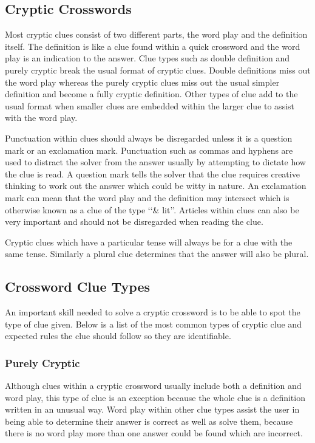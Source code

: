 \subsection{Cryptic Crosswords}
Most cryptic clues consist of two different parts, the word play and the definition itself. The definition is like a clue found within a quick crossword and the word play is an indication to the answer. Clue types such as double definition and purely cryptic break the usual format of cryptic clues. Double definitions miss out the word play whereas the purely cryptic clues miss out the usual simpler definition and become a fully cryptic definition. Other types of clue add to the usual format when smaller clues are embedded within the larger clue to assist with the word play.

Punctuation within clues should always be disregarded unless it is a question mark or an exclamation mark. Punctuation such as commas and hyphens are used to distract the solver from the answer usually by attempting to dictate how the clue is read. A question mark tells the solver that the clue requires creative thinking to work out the answer which could be witty in nature. An exclamation mark can mean that the word play and the definition may intersect which is otherwise known as a clue of the type \lq\lq \& lit\rq\rq. Articles within clues can also be very important and should not be disregarded when reading the clue.

Cryptic clues which have a particular tense will always be for a clue with the same tense. Similarly a plural clue determines that the answer will also be plural.

\subsection{Crossword Clue Types}
An important skill needed to solve a cryptic crossword is to be able to spot the type of clue given. Below is a list of the most common types of cryptic clue and expected rules the clue should follow so they are identifiable. 

\subsubsection{Purely Cryptic}
Although clues within a cryptic crossword usually include both a definition and word play, this type of clue is an exception because the whole clue is a definition written in an unusual way. Word play within other clue types assist the user in being able to determine their answer is correct as well as solve them, because there is no word play more than one answer could be found which are incorrect.  

